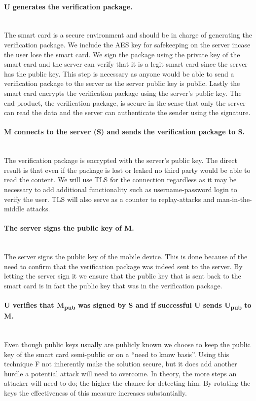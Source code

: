 \paragraph{U generates the verification package.}\mbox{}\\
The smart card is a secure environment and should be in charge of generating the verification package. We include the AES key for safekeeping on the server incase the user lose the smart card. We sign the package using the private key of the smart card and the server can verify that it is a legit smart card since the server has the public key. This step is necessary as anyone would be able to send a verification package to the server as the server public key is public. Lastly the smart card encrypts the verification package using the server's public key. The end product, the verification package, is secure in the sense that only the server can read the data and the server can authenticate the sender using the signature.

\paragraph{M connects to the server (S) and sends the verification package to S.}\mbox{}\\
The verification package is encrypted with the server's public key. The direct result is that even if the package is lost or leaked no third party would be able to read the content. We will use TLS for the connection regardless as it may be necessary to add additional functionality such as username-password login to verify the user. TLS will also serve as a counter to replay-attacks and man-in-the-middle attacks.

\paragraph{The server signs the public key of M.}\mbox{}\\
The server signs the public key of the mobile device. This is done because of the need to confirm that the verification package was indeed sent to the server. By letting the server sign it we ensure that the public key that is sent back to the smart card is in fact the public key that was in the verification package.

\paragraph{U verifies that M\textsubscript{pub} was signed by S and if successful U sends U\textsubscript{pub} to M.}\mbox{}\\
Even though public keys usually are publicly known we choose to keep the public key of the smart card semi-public or on a ``need to know basis''. Using this technique F not inherently make the solution secure, but it does add another hurdle a potential attack will need to overcome. In theory, the more steps an attacker will need to do; the higher the chance for detecting him. By rotating the keys the effectiveness of this measure increases substantially.


